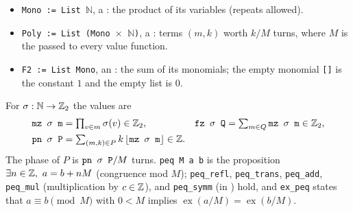 \begin{definition}\label{def:lean-pathsum-poly}
\begin{itemize}
\item \textnormal{\texttt{Mono := List \ensuremath{\mathbb{N}}}}, a : the product of its variables (repeats allowed).
\item \textnormal{\texttt{Poly := List (\allowbreak{}Mono \ensuremath{\times} \ensuremath{\mathbb{N}})}}, a : terms $(m,k)$ worth $k/M$ turns,
  where $M$ is the  passed to every value function.
\item \textnormal{\texttt{F2 := List Mono}}, an : the sum of its monomials; the
  empty monomial \textnormal{\texttt{[]}} is the constant $1$ and the empty list is $0$.
\end{itemize}
For $\sigma:\mathbb{N}\to\mathbb{Z}_{2}$ the values are
\begin{align*}
\textnormal{\texttt{mz \ensuremath{\sigma} m}} &= \textstyle\prod_{v\in m}\sigma(v)\in\mathbb{Z}_{2}, &
\textnormal{\texttt{fz \ensuremath{\sigma} Q}} &= \textstyle\sum_{m\in Q}\textnormal{\texttt{mz \ensuremath{\sigma} m}}\in\mathbb{Z}_{2},\\
\textnormal{\texttt{pn \ensuremath{\sigma} P}} &= \textstyle\sum_{(m,k)\in P} k\,\lfloor\textnormal{\texttt{mz \ensuremath{\sigma} m}}\rfloor\in\mathbb{Z} .
\end{align*}
The phase of $P$ is $\textnormal{\texttt{pn \ensuremath{\sigma} P}}/M$ turns. \textnormal{\texttt{peq M a b}} is the proposition
$\exists n\in\mathbb{Z},\ a = b + nM$ (congruence mod $M$); \textnormal{\texttt{peq\_\allowbreak{}refl}}, \textnormal{\texttt{peq\_\allowbreak{}trans}},
\textnormal{\texttt{peq\_\allowbreak{}add}}, \textnormal{\texttt{peq\_\allowbreak{}mul}} (multiplication by $c\in\mathbb{Z}$), and \textnormal{\texttt{peq\_\allowbreak{}symm}} (in
) hold, and \textnormal{\texttt{ex\_\allowbreak{}peq}} states that $a\equiv b\pmod M$ with $0<M$ implies
$\operatorname{ex}(a/M)=\operatorname{ex}(b/M)$.
\end{definition}

